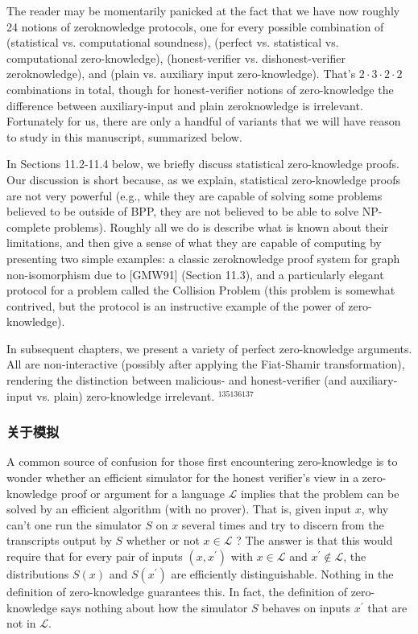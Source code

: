The reader may be momentarily panicked at the fact that we have now roughly 24 notions of zeroknowledge protocols, one for every possible combination of (statistical vs. computational soundness), (perfect vs. statistical vs. computational zero-knowledge), (honest-verifier vs. dishonest-verifier zeroknowledge), and (plain vs. auxiliary input zero-knowledge). That's $2 \cdot 3 \cdot 2 \cdot 2$ combinations in total, though for honest-verifier notions of zero-knowledge the difference between auxiliary-input and plain zeroknowledge is irrelevant. Fortunately for us, there are only a handful of variants that we will have reason to study in this manuscript, summarized below.

In Sections 11.2-11.4 below, we briefly discuss statistical zero-knowledge proofs. Our discussion is short because, as we explain, statistical zero-knowledge proofs are not very powerful (e.g., while they are capable of solving some problems believed to be outside of BPP, they are not believed to be able to solve NP-complete problems). Roughly all we do is describe what is known about their limitations, and then give a sense of what they are capable of computing by presenting two simple examples: a classic zeroknowledge proof system for graph non-isomorphism due to [GMW91] (Section 11.3), and a particularly elegant protocol for a problem called the Collision Problem (this problem is somewhat contrived, but the protocol is an instructive example of the power of zero-knowledge).

In subsequent chapters, we present a variety of perfect zero-knowledge arguments. All are non-interactive (possibly after applying the Fiat-Shamir transformation), rendering the distinction between malicious- and honest-verifier (and auxiliary-input vs. plain) zero-knowledge irrelevant. ${ }^{135136137}$

\subsubsection{关于模拟} A common source of confusion for those first encountering zero-knowledge is to wonder whether an efficient simulator for the honest verifier’s view in a zero-knowledge proof or argument for a language $\mathcal{L}$ implies that the problem can be solved by an efficient algorithm (with no prover). That is, given input $x$, why can't one run the simulator $S$ on $x$ several times and try to discern from the transcripts output by $S$ whether or not $x \in \mathcal{L}$ ? The answer is that this would require that for every pair of inputs $\left(x, x^{\prime}\right)$ with $x \in \mathcal{L}$ and $x^{\prime} \notin \mathcal{L}$, the distributions $S(x)$ and $S\left(x^{\prime}\right)$ are efficiently distinguishable. Nothing in the definition of zero-knowledge guarantees this. In fact, the definition of zero-knowledge says nothing about how the simulator $S$ behaves on inputs $x^{\prime}$ that are not in $\mathcal{L}$.

